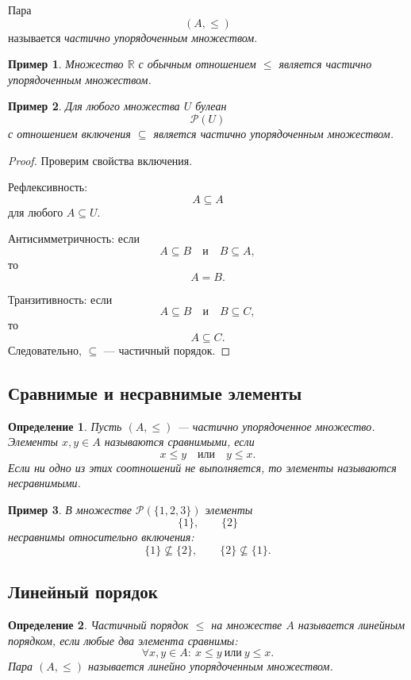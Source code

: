 \documentclass[12pt,a4paper]{article}
\newtheorem{definition}{Определение}
\newtheorem{example}{Пример}
\begin{document}
Пара
\[
(A,\leq)
\]
называется \emph{частично упорядоченным множеством}.

\begin{example}
Множество $\mathbb R$ с обычным отношением $\leq$ является частично упорядоченным множеством.
\end{example}

\begin{example}
Для любого множества $U$ булеан
\[
\mathcal P(U)
\]
с отношением включения $\subseteq$ является частично упорядоченным множеством.
\end{example}

\begin{proof}
Проверим свойства включения.

Рефлексивность:
\[
A\subseteq A
\]
для любого $A\subseteq U$.

Антисимметричность:
если
\[
A\subseteq B
\quad\text{и}\quad
B\subseteq A,
\]
то
\[
A=B.
\]

Транзитивность:
если
\[
A\subseteq B
\quad\text{и}\quad
B\subseteq C,
\]
то
\[
A\subseteq C.
\]
Следовательно, $\subseteq$ --- частичный порядок.
\end{proof}

\subsection{Сравнимые и несравнимые элементы}

\begin{definition}
Пусть $(A,\leq)$ --- частично упорядоченное множество.
Элементы $x,y\in A$ называются \emph{сравнимыми}, если
\[
x\leq y
\quad\text{или}\quad
y\leq x.
\]
Если ни одно из этих соотношений не выполняется, то элементы называются \emph{несравнимыми}.
\end{definition}

\begin{example}
В множестве $\mathcal P(\{1,2,3\})$ элементы
\[
\{1\},\qquad \{2\}
\]
несравнимы относительно включения:
\[
\{1\}\nsubseteq \{2\},
\qquad
\{2\}\nsubseteq \{1\}.
\]
\end{example}

\subsection{Линейный порядок}

\begin{definition}
Частичный порядок $\leq$ на множестве $A$ называется \emph{линейным порядком}, если любые два элемента сравнимы:
\[
\forall x,y\in A:\ x\leq y\ \text{или}\ y\leq x.
\]
Пара $(A,\leq)$ называется \emph{линейно упорядоченным множеством}.
\end{definition}
\end{document}
